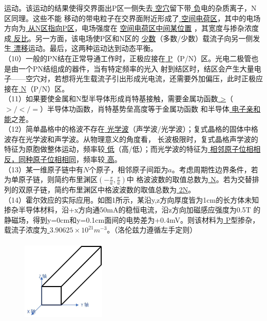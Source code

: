 \documentclass[UTF8]{ctexart}
\begin{document}
运动。该运动的结果使得交界面出P区一侧失去\uline{{\color{white} 空穴}}留下带\uline{{\color{white} 负}}电的杂质离子，N区同理。这些不能
移动的带电粒子在交界面附近形成了\uline{{\color{white} 空间电荷区}}，其中的电场方向为\uline{{\color{white} 从N区指向P区}}，电场强度在
\uline{{\color{white} 空间电荷区中间某位置}} ，其宽度与掺杂浓度成\uline{{\color{white} 反比}}。另一方面，该电场使P区和N区的
\uline{{\color{white} 少数}}（多数/少数）载流子向另一侧发生\uline{{\color{white} 漂移}}运动。最后，这两种运动达到动态平衡。\\
（10）一般的PN结在正常导通工作时，正极应接在\uline{{\color{white} P}}（P/N）区。光电二极管也是由一个PN结组成的器件，当有特定频率的光入
射到结区时，结区会产生大量电子——空穴对，若想将光生载流子引出形成光电流，还需要外加偏压，此时正极应接在\uline{{\color{white} N}}（P/N）区。\\
（11）如果要使金属和N型半导体形成肖特基接触，需要金属功函数\uline{{\color{white} >}}（$>/</=$）半导体功函数，肖特基势垒高度等于金属功函数
和半导体\uline{{\color{white} 电子亲和能}}之差。\\
（12）简单晶格中的格波不存在\uline{{\color{white} 光学波}}（声学波/光学波）；复式晶格的固体中格波存在光学波和声学波。从物理意义的角度看，
长波极限时，复式晶格声学波的特征为原胞做整体运动，频率较\uline{{\color{white} 低}}（高/低）；而光学波的特征为\uline{{\color{white} 
相邻原子位相相反，同种原子位相相同}}，频率较\uline{{\color{white} 高}}。\\
（13）某一维原子链中有$N$个原子，相邻原子间距为$a$。考虑周期性边界条件，若为单原子链，则简约布里渊区$(-\frac{\pi}{a},\frac{\pi}{a})$中
格波波数的取值总数为\uline{{\color{white} N}}。若为交替排列的双原子链，简约布里渊区中格波波数的取值总数为\uline{{\color{white} 2N}}。\\
（14）霍尔效应的实际应用。如图1所示，某沿y,z方向厚度皆为1cm的长方体未知掺杂半导体材料，沿+x方向通50mA的稳恒电流，沿z方向加磁感应强度为0.5T
的静磁场，得到y=0cm和y=0.1cm面间的电势差为+0.4mV。则该材料为\uline{{\color{white} P}}型掺杂，载流子浓度为\uline{{\color{white} 
$3.90625\times10^{21}m^{-3}$}}。（洛伦兹力遵循左手定则）\\
\begin{figure}[H]                                        
    \centering                                                
    \includegraphics[width=4cm,height=4cm]{图1.jpg}        
    \caption{}                                                                                  
\end{figure}                                              
\end{document}
